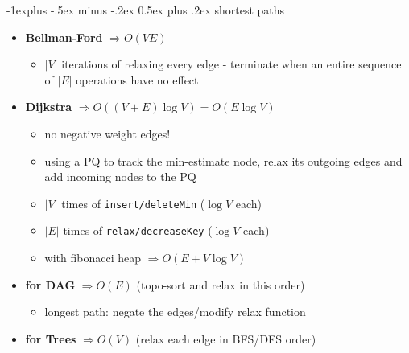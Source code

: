 \documentclass[10pt, landscape]{article}
\makeatletter
\renewcommand{\subsection}{\@startsection{subsection}{2}{0mm}%
                                {-1explus -.5ex minus -.2ex}%
                                {0.5ex plus .2ex}%
                                {\normalfont\normalsize\bfseries}}
\newcommand{\abs}[1]{\vert #1 \vert}
\let\then\Rightarrow
\newcommand{\code}[1]{\textcolor{myblue}{\texttt{#1}}}
\makeatother
\begin{document}
\begin{multicols}{4}
\subsection{shortest paths}
\begin{itemize}
    \item \textbf{Bellman-Ford} $\then O(VE)$
    \begin{itemize}
        \item $\abs{V}$ iterations of relaxing every edge - terminate when an entire sequence of $\abs{E}$ operations have no effect
    \end{itemize}
    \item \textbf{Dijkstra} $\then O((V+E)\log V) = O(E\log V)$
    \begin{itemize}
        \item no negative weight edges!
        \item using a PQ to track the min-estimate node, relax its outgoing edges and add incoming nodes to the PQ
        \item $\abs{V}$ times of \code{insert/deleteMin} ($\log V$ each)
        \item $\abs{E}$ times of \code{relax/decreaseKey} ($\log V$ each)
        \item with fibonacci heap $\then O(E + V \log V)$
    \end{itemize}
    \item \textbf{for DAG} $\then O(E)$ (topo-sort and relax in this order)
    \begin{itemize}
        \item longest path: negate the edges/modify relax function
    \end{itemize}
    \item \textbf{for Trees} $\then O(V)$ (relax each edge in BFS/DFS order)
\end{itemize}


\end{multicols}
\end{document}
